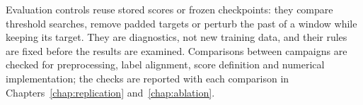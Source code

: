 Evaluation controls reuse stored scores or frozen checkpoints: they compare
threshold searches, remove padded targets or perturb the past of a window
while keeping its target. They are diagnostics, not new training data, and
their rules are fixed before the results are examined. Comparisons between
campaigns are checked for preprocessing, label alignment, score definition
and numerical implementation; the checks are reported with each comparison
in Chapters~\ref{chap:replication} and~\ref{chap:ablation}.
